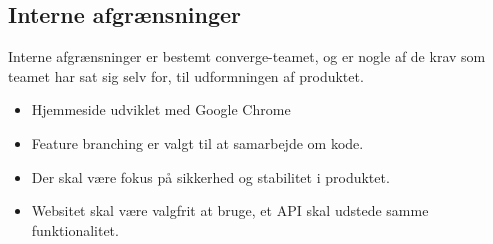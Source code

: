 \subsection{Interne afgrænsninger}

Interne afgrænsninger er bestemt converge-teamet, og er nogle af de krav som teamet har sat sig selv for, til udformningen af produktet.

\begin{itemize}
  \item Hjemmeside udviklet med Google Chrome
  \item Feature branching er valgt til at samarbejde om kode.
  \item Der skal være fokus på sikkerhed og stabilitet i produktet.
  \item Websitet skal være valgfrit at bruge, et API skal udstede samme funktionalitet.
\end{itemize}